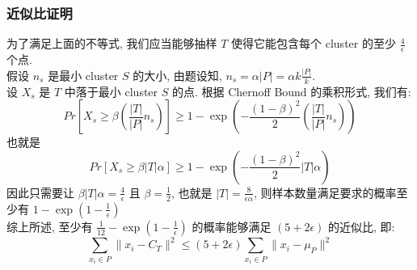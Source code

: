 \documentclass[UTF8]{article}
\begin{document}
\subsubsection*{近似比证明}
\noindent 为了满足上面的不等式, 我们应当能够抽样 $T$ 使得它能包含每个 cluster 的至少 $\frac{4}{\epsilon}$ 个点. \\
假设 $n_s$ 是最小 cluster $S$ 的大小, 由题设知, $n_s=\alpha|P|=\alpha k\frac{|P|}{k}$. \\
设 $X_s$ 是 $T$ 中落于最小 cluster $S$ 的点. 根据 Chernoff Bound 的乘积形式, 我们有:
$$Pr\left[X_s \ge \beta\left(\frac{|T|}{|P|}n_s\right)\right] \ge 1 - \exp\left(-\frac{(1-\beta)^2}{2}\left(\frac{|T|}{|P|}n_s\right)\right)$$
也就是
$$Pr\left[X_s \ge \beta|T|\alpha\right] \ge 1 - \exp\left(-\frac{(1-\beta)^2}{2}|T|\alpha\right)$$
因此只需要让 $\beta|T|\alpha=\frac{4}{\epsilon}$ 且 $\beta=\frac{1}{2}$, 也就是 $|T|=\frac{8}{\epsilon\alpha}$, 则样本数量满足要求的概率至少有 $1-\exp(1-\frac{1}{\epsilon})$\\
\noindent
综上所述, 至少有 $\frac{1}{12} - \exp(1-\frac{1}{\epsilon})$ 的概率能够满足 $(5+2\epsilon)$ 的近似比, 即:
$$\sum\limits_{x_i\in P}\|x_i-C_T\|^2 \le (5+2\epsilon)\sum\limits_{x_i\in P}\|x_i-\mu_P\|^2$$
\end{document}
